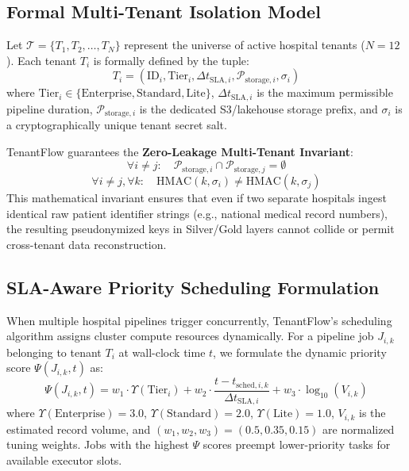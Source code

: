 \documentclass[10pt,journal,compsoc]{IEEEtran}
\begin{document}
\subsection{Formal Multi-Tenant Isolation Model}
Let $\mathcal{T} = \{T_1, T_2, \dots, T_N\}$ represent the universe of active hospital tenants ($N=12$). Each tenant $T_i$ is formally defined by the tuple:
\begin{equation}
T_i = \left( \text{ID}_i, \text{Tier}_i, \Delta t_{\text{SLA}, i}, \mathcal{P}_{\text{storage}, i}, \sigma_i \right)
\end{equation}
where $\text{Tier}_i \in \{\text{Enterprise}, \text{Standard}, \text{Lite}\}$, $\Delta t_{\text{SLA}, i}$ is the maximum permissible pipeline duration, $\mathcal{P}_{\text{storage}, i}$ is the dedicated S3/lakehouse storage prefix, and $\sigma_i$ is a cryptographically unique tenant secret salt.

TenantFlow guarantees the \textbf{Zero-Leakage Multi-Tenant Invariant}:
\begin{equation}
\forall i \neq j: \quad \mathcal{P}_{\text{storage}, i} \cap \mathcal{P}_{\text{storage}, j} = \emptyset
\end{equation}
\begin{equation}
\forall i \neq j, \forall k: \quad \text{HMAC}(k, \sigma_i) \neq \text{HMAC}(k, \sigma_j)
\end{equation}
This mathematical invariant ensures that even if two separate hospitals ingest identical raw patient identifier strings (e.g., national medical record numbers), the resulting pseudonymized keys in Silver/Gold layers cannot collide or permit cross-tenant data reconstruction.

\subsection{SLA-Aware Priority Scheduling Formulation}
When multiple hospital pipelines trigger concurrently, TenantFlow's scheduling algorithm assigns cluster compute resources dynamically. For a pipeline job $J_{i,k}$ belonging to tenant $T_i$ at wall-clock time $t$, we formulate the dynamic priority score $\Psi(J_{i,k}, t)$ as:
\begin{equation}
\Psi(J_{i,k}, t) = w_1 \cdot \Upsilon(\text{Tier}_i) + w_2 \cdot \frac{t - t_{\text{sched}, i, k}}{\Delta t_{\text{SLA}, i}} + w_3 \cdot \log_{10}(V_{i,k})
\end{equation}
where $\Upsilon(\text{Enterprise}) = 3.0$, $\Upsilon(\text{Standard}) = 2.0$, $\Upsilon(\text{Lite}) = 1.0$, $V_{i,k}$ is the estimated record volume, and $(w_1, w_2, w_3) = (0.5, 0.35, 0.15)$ are normalized tuning weights. Jobs with the highest $\Psi$ scores preempt lower-priority tasks for available executor slots.
\end{document}

